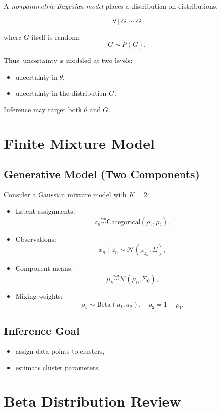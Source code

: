 \documentclass[12pt,oneside]{book}
\numberwithin{equation}{section}
\theoremstyle{definition}
\theoremstyle{plain}
\theoremstyle{remark}
\begin{document}
A \emph{nonparametric Bayesian model} places a distribution on distributions.

\[
\theta \mid G \sim G
\]

where $G$ itself is random:
\[
G \sim P(G).
\]

Thus, uncertainty is modeled at two levels:
\begin{itemize}
\item uncertainty in $\theta$,
\item uncertainty in the distribution $G$.
\end{itemize}

Inference may target both $\theta$ and $G$.

\section{Finite Mixture Model}

\subsection*{Generative Model (Two Components)}

Consider a Gaussian mixture model with $K=2$:

\begin{itemize}
\item Latent assignments:
\[
z_n \stackrel{iid}{\sim} \mathrm{Categorical}(\rho_1,\rho_2),
\]

\item Observations:
\[
x_n \mid z_n \sim \mathcal{N}(\mu_{z_n}, \Sigma),
\]

\item Component means:
\[
\mu_k \stackrel{iid}{\sim} \mathcal{N}(\mu_0, \Sigma_0),
\]

\item Mixing weights:
\[
\rho_1 \sim \mathrm{Beta}(a_1,a_2), \quad \rho_2 = 1 - \rho_1.
\]
\end{itemize}

\subsection*{Inference Goal}

\begin{itemize}
\item assign data points to clusters,
\item estimate cluster parameters.
\end{itemize}

\section{Beta Distribution Review}
\end{document}
